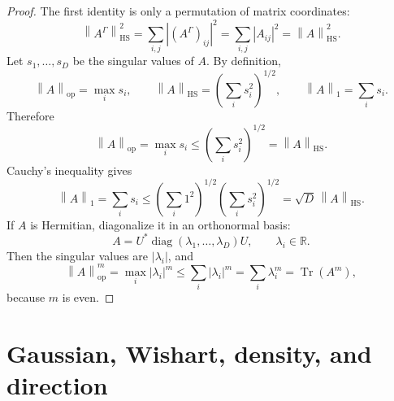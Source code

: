 \documentclass[11pt,oneside]{book}
\DeclareMathOperator{\Tr}{Tr}
\DeclareMathOperator{\diag}{diag}
\newcommand{\R}{\mathbb R}
\newcommand{\1}{\mathbf 1}
\newcommand{\pt}{\Gamma}
\newcommand{\HS}{\mathrm{HS}}
\newcommand{\op}{\mathrm{op}}
\newcommand{\norm}[1]{\left\|#1\right\|}
\begin{document}
\begin{proof}
The first identity is only a permutation of matrix coordinates:
\[
  \norm{A^\pt}_{\HS}^2
  =
  \sum_{i,j}|(A^\pt)_{ij}|^2
  =
  \sum_{i,j}|A_{ij}|^2
  =
  \norm A_{\HS}^2 .
\]
Let \(s_1,\ldots,s_D\) be the singular values of \(A\).  By definition,
\[
  \norm A_{\op}=\max_i s_i,\qquad
  \norm A_{\HS}=\left(\sum_i s_i^2\right)^{1/2},\qquad
  \norm A_1=\sum_i s_i .
\]
Therefore
\[
  \norm A_{\op}
  =
  \max_i s_i
  \le
  \left(\sum_i s_i^2\right)^{1/2}
  =
  \norm A_{\HS}.
\]
Cauchy's inequality gives
\[
  \norm A_1
  =
  \sum_i s_i
  \le
  \left(\sum_i1^2\right)^{1/2}
  \left(\sum_i s_i^2\right)^{1/2}
  =
  \sqrt D\,\norm A_{\HS}.
\]
If \(A\) is Hermitian, diagonalize it in an orthonormal basis:
\[
  A=U^*\diag(\lambda_1,\ldots,\lambda_D)U,\qquad \lambda_i\in\R.
\]
Then the singular values are \(|\lambda_i|\), and
\[
  \norm A_{\op}^m=\max_i |\lambda_i|^m\le \sum_i |\lambda_i|^m
  =\sum_i \lambda_i^m=\Tr(A^m),
\]
because \(m\) is even.
\end{proof}

\section{Gaussian, Wishart, density, and direction}
\end{document}
